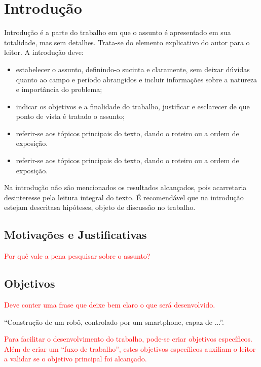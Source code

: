 
\chapter{Introdução}

Introdução é a parte do trabalho em que o assunto é apresentado em sua totalidade, mas sem detalhes. Trata-se do elemento explicativo do autor para o leitor. A introdução deve:

\begin{itemize}
    \item estabelecer o assunto, definindo-o sucinta e claramente, sem deixar dúvidas quanto ao campo e período abrangidos e incluir informações sobre a natureza e importância do problema;
    \item indicar os objetivos e a finalidade do trabalho, justificar e esclarecer de que ponto de vista é tratado o assunto;
    \item referir-se aos tópicos principais do texto, dando o roteiro ou a ordem de exposição.
    \item referir-se aos tópicos principais do texto, dando o roteiro ou a ordem de exposição.
\end{itemize}

Na introdução não são mencionados os resultados alcançados, pois acarretaria desinteresse pela leitura integral do texto. É recomendável que na introdução estejam descritasa hipóteses, objeto de discussão no trabalho.

\section{Motivações e Justificativas}

\textcolor{red}{Por quê vale a pena pesquisar sobre o assunto?}

\section{Objetivos}

\textcolor{red}{Deve conter uma frase que deixe bem claro o que será desenvolvido.}

``Construção de um robô, controlado por um smartphone, capaz de ...''.

\textcolor{red}{Para facilitar o desenvolvimento do trabalho, pode-se criar objetivos específicos. Além de criar um ``fuxo de trabalho'', estes objetivos específicos auxiliam o leitor a validar se o objetivo principal foi alcançado.}

